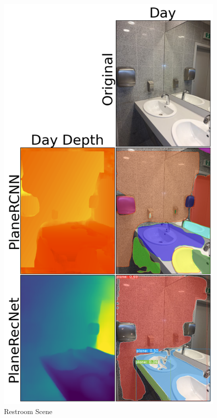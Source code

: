 \begin{figure}[H]
    \centering
    \includegraphics[width=1.0\textwidth]{images/results/Restroom.png}
    \caption{Restroom Scene}
    \label{figure:Restroom}
\end{figure}

